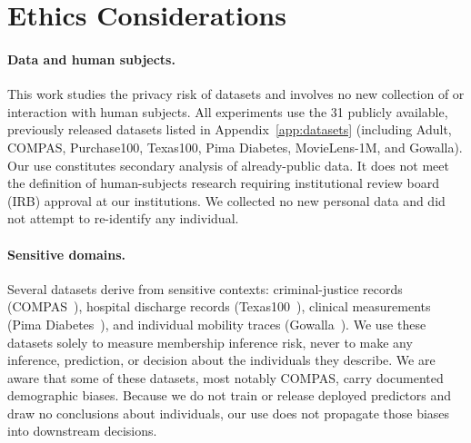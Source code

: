 
\section*{Ethics Considerations}

\paragraph{Data and human subjects.}
This work studies the privacy risk of datasets and involves no new
collection of or interaction with human subjects. All experiments use the
31 publicly available, previously released datasets listed in
Appendix~\ref{app:datasets} (including Adult, COMPAS, Purchase100,
Texas100, Pima Diabetes, MovieLens-1M, and Gowalla).
Our use constitutes secondary analysis of already-public data. It does not
meet the definition of human-subjects research requiring institutional
review board (IRB) approval at our institutions. We collected no new
personal data and did not attempt to re-identify any individual.

\paragraph{Sensitive domains.}
Several datasets derive from sensitive contexts: criminal-justice records
(COMPAS~\cite{compas2016}), hospital discharge records
(Texas100~\cite{shokri2017membership}), clinical measurements (Pima
Diabetes~\cite{smith1988pima}), and individual mobility traces
(Gowalla~\cite{cho2011friendship}). We use these
datasets solely to measure membership inference risk, never to make
any inference, prediction, or decision about the individuals they describe.
We are aware that some of these datasets, most notably COMPAS, carry
documented demographic biases. Because we do not train or release deployed
predictors and draw no conclusions about individuals, our use does not
propagate those biases into downstream decisions.

